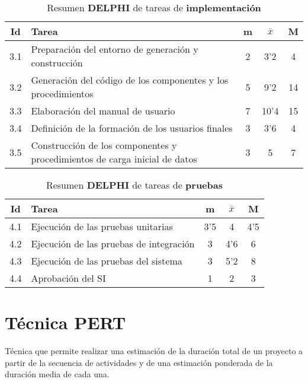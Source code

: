 \documentclass[11pt,a4paper,spanish,twoside]{report}
\begin{document}
\begin{table}[!h]
\centering
  \begin{tabular}{|c||p{8cm}||c|c|c|}
    \hline
    \textbf{Id} & \textbf{Tarea} & \textbf{m} & 
    \textbf{$\bar{x}$} &\textbf{M} \\
    \hline \hline
    3.1 & Preparación del entorno de generación y construcción & 2 & 3'2  & 4 \\
    \hline
    3.2 & Generación del código de los componentes y los procedimientos & 5 &
    9'2 & 14\\
    \hline
    3.3 & Elaboración del manual de usuario & 7 & 10'4 & 15\\
    \hline
    3.4 & Definición de la formación de los usuarios finales & 3 & 3'6 & 4 \\
    \hline
    3.5 & Construcción de los componentes y procedimientos de carga inicial
    de datos & 3 & 5 & 7\\
    \hline
  \end{tabular}
  \caption{Resumen \textbf{DELPHI} de tareas de \textbf{implementación}}
  \label{Tab:rDELPHIimp}
\end{table}

\begin{table}[!h]
\centering
  \begin{tabular}{|c||p{8cm}||c|c|c|}
    \hline
    \textbf{Id} & \textbf{Tarea} & \textbf{m} & 
    \textbf{$\bar{x}$} &\textbf{M} \\
    \hline \hline
    4.1 & Ejecución de las pruebas unitarias & 3'5 & 4 & 4'5\\
    \hline
    4.2 & Ejecución de las pruebas de integración & 3 & 4'6 & 6\\
    \hline
    4.3 & Ejecución de las pruebas del sistema & 3 & 5'2 & 8\\
    \hline
    4.4 & Aprobación del SI & 1 & 2 & 3 \\
    \hline
  \end{tabular}
  \caption{Resumen \textbf{DELPHI} de tareas de \textbf{pruebas}}
  \label{Tab:rDELPHIpru}
\end{table}


\chapter{Técnica PERT}
Técnica que permite realizar una estimación de la duración total de un
proyecto a partir de la secuencia de actividades y de una estimación
ponderada de la duración media de cada una. 
\end{document}

